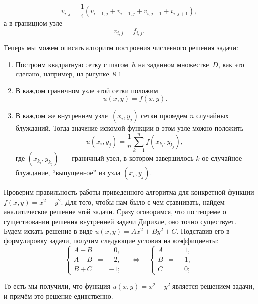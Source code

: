 $$
v_{i,j}=\frac{1}{4}(v_{i-1,j}+v_{i+1,j}+v_{i,j-1}+v_{i,j+1}),
$$
а в границном узле
$$
v_{i,j}=f_{i,j}.
$$

Теперь мы можем описать алгоритм построения численного решения задачи:

\begin{enumerate}
        \item Построим квадратную сетку с шагом~$h$ на заданном множестве~$D$, как это сделано, например, на рисунке~8.1.
        \item В каждом граничном узле этой сетки положим
$$
        u(x,y) = f(x,y).
$$ 
        \item В каждом же внутреннем узле~$(x_i,y_j)$ сетки проведем $n$ случайных блужданий. Тогда значение искомой функции в этом узле можно положить
$$
        u(x_i, y_j) = \frac{1}{n} \sum_{k=1}^{n} f(x_{k_i}, y_{k_j}), 
$$
        где $(x_{k_i}, y_{k_j})$~--- граничный узел, в котором завершилось $k$-ое случайное блуждание, ``выпущенное'' из узла $(x_i,y_j)$.
\end{enumerate}


Проверим правильность работы приведенного алгоритма для конкретной функции
$f(x,y) = x^2 - y^2$.
Для того, чтобы нам было с чем сравнивать, найдем аналитическое решение этой задачи.
Сразу оговоримся, что по теореме о существовании решения внутренней задачи Дирихле, оно точно существует.
Будем искать решение в виде
$u(x,y)=Ax^2+By^2+C$.
Подставив его в формулировку задачи, получим следующие условия на коэффициенты:
\[
\left\lbrace
\begin{array}{rcl}
A+B&=&\;\;\,0,\\
A-B&=&\;\;\,2,\\
B+C&=&-1;
\end{array}
\right.\quad\Longleftrightarrow\quad
\left\lbrace
\begin{array}{rcl}
A&=&\;\;\,1,\\
B&=&-1,\\
C&=&\;\;\,0;
\end{array}
\right.
\]

То есть мы получили, что функция
$u(x,y)=x^2-y^2$
является решением задачи, и причём это решение единственно.

\clearpage

